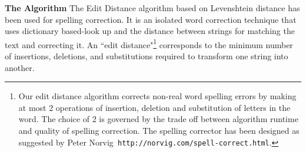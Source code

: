 \documentclass[preprint,11pt]{elsarticle}
\begin{document}
\textbf{The Algorithm}
\label{spell:algorithm}
The Edit Distance algorithm based on Levenshtein distance\cite{levenshtein1966binary} has been used for spelling correction. It is an isolated word correction technique that uses dictionary based-look up and the distance between strings for matching the text and correcting it. An ``edit distance"\footnote{Our edit distance algorithm corrects non-real word spelling errors by making at most 2 operations of insertion, deletion and substitution of letters in the word. The choice of 2 is governed by the trade off between algorithm runtime and quality of spelling correction. The spelling corrector has been designed as suggested by Peter Norvig\texttt{ http://norvig.com/spell-correct.html}.} corresponds to the minimum number of insertions, deletions, and substitutions required to transform one string into another. %
\end{document}
